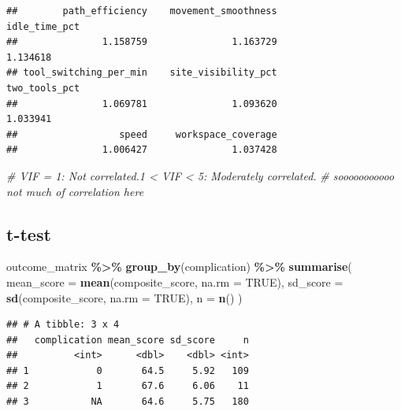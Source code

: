 \documentclass[
]{article}
\newenvironment{Shaded}{\begin{snugshade}}{\end{snugshade}}
\newcommand{\AttributeTok}[1]{\textcolor[rgb]{0.13,0.29,0.53}{#1}}
\newcommand{\CommentTok}[1]{\textcolor[rgb]{0.56,0.35,0.01}{\textit{#1}}}
\newcommand{\ConstantTok}[1]{\textcolor[rgb]{0.56,0.35,0.01}{#1}}
\newcommand{\FunctionTok}[1]{\textcolor[rgb]{0.13,0.29,0.53}{\textbf{#1}}}
\newcommand{\NormalTok}[1]{#1}
\newcommand{\SpecialCharTok}[1]{\textcolor[rgb]{0.81,0.36,0.00}{\textbf{#1}}}
\begin{document}
\begin{verbatim}
##        path_efficiency    movement_smoothness          idle_time_pct 
##               1.158759               1.163729               1.134618 
## tool_switching_per_min    site_visibility_pct          two_tools_pct 
##               1.069781               1.093620               1.033941 
##                  speed     workspace_coverage 
##               1.006427               1.037428
\end{verbatim}

\begin{Shaded}
\begin{Highlighting}[]
\CommentTok{\# VIF = 1: Not correlated.1 \textless{} VIF \textless{} 5: Moderately correlated.}
\CommentTok{\# sooooooooooo not much of correlation here}
\end{Highlighting}
\end{Shaded}

\subsection{t-test}\label{t-test}

\begin{Shaded}
\begin{Highlighting}[]
\NormalTok{outcome\_matrix }\SpecialCharTok{\%\textgreater{}\%}
  \FunctionTok{group\_by}\NormalTok{(complication) }\SpecialCharTok{\%\textgreater{}\%}
  \FunctionTok{summarise}\NormalTok{(}
    \AttributeTok{mean\_score =} \FunctionTok{mean}\NormalTok{(composite\_score, }\AttributeTok{na.rm =} \ConstantTok{TRUE}\NormalTok{),}
    \AttributeTok{sd\_score =} \FunctionTok{sd}\NormalTok{(composite\_score, }\AttributeTok{na.rm =} \ConstantTok{TRUE}\NormalTok{),}
    \AttributeTok{n =} \FunctionTok{n}\NormalTok{()}
\NormalTok{  )}
\end{Highlighting}
\end{Shaded}

\begin{verbatim}
## # A tibble: 3 x 4
##   complication mean_score sd_score     n
##          <int>      <dbl>    <dbl> <int>
## 1            0       64.5     5.92   109
## 2            1       67.6     6.06    11
## 3           NA       64.6     5.75   180
\end{verbatim}
\end{document}
